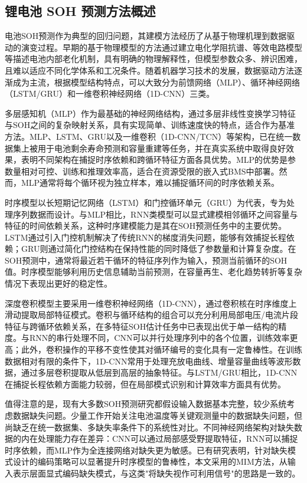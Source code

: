 \documentclass[10pt,a4paper]{ctexart}
\begin{document}
\subsection{锂电池 SOH 预测方法概述}

电池SOH预测作为典型的回归问题，其建模方法经历了从基于物理机理到数据驱动的演变过程\cite{liu2025deep}。早期的基于物理模型的方法通过建立电化学阻抗谱、等效电路模型等描述电池内部老化机制，具有明确的物理解释性，但模型参数众多、辨识困难，且难以适应不同化学体系和工况条件。随着机器学习技术的发展，数据驱动方法逐渐成为主流\cite{liu2025deep}，根据模型结构特点，可以大致分为前馈网络（MLP）、循环神经网络（LSTM/GRU）和一维卷积神经网络（1D-CNN）三类。

多层感知机（MLP）作为最基础的神经网络结构，通过多层非线性变换学习特征与SOH之间的复杂映射关系，具有实现简单、训练速度快的特点，适合作为基准方法\cite{bairwa2025cycle}。MLP、LSTM、GRU以及一维卷积（1D-CNN/TCN）等架构，已在统一数据集上被用于电池剩余寿命预测和容量重建等任务，并在真实系统中取得良好效果\cite{bairwa2025cycle}，表明不同架构在捕捉时序依赖和跨循环特征方面各具优势。MLP的优势是参数量相对可控、训练和推理效率高，适合在资源受限的嵌入式BMS中部署。然而，MLP通常将每个循环视为独立样本，难以捕捉循环间的时序依赖关系。

时序模型以长短期记忆网络（LSTM）和门控循环单元（GRU）为代表，专为处理序列数据而设计\cite{bairwa2025cycle}。与MLP相比，RNN类模型可以显式建模相邻循环之间容量与特征的时间依赖关系，这种时序建模能力是其在SOH预测任务中的主要优势。LSTM通过引入门控机制解决了传统RNN的梯度消失问题，能够有效捕捉长程依赖；GRU则通过简化门控结构在保持性能的同时降低了参数量和计算复杂度。在SOH预测中，通常将最近若干循环的特征序列作为输入，预测当前循环的SOH值。时序模型能够利用历史信息辅助当前预测，在容量再生、老化趋势转折等复杂情况下表现出更好的稳定性。

深度卷积模型主要采用一维卷积神经网络（1D-CNN），通过卷积核在时序维度上滑动提取局部特征模式\cite{zhang2024cnnsoh}。卷积与循环结构的组合可以充分利用局部电压/电流片段特征与跨循环依赖关系，在多特征SOH估计任务中已表现出优于单一结构的精度\cite{zhang2024cnnsoh}。与RNN的串行处理不同，CNN可以并行处理序列中的各个位置，训练效率更高；此外，卷积操作的平移不变性使其对循环编号的变化具有一定鲁棒性。在训练数据相对有限的条件下，1D-CNN常用于处理充放电曲线、增量容量曲线等波形数据，通过多层卷积提取从低层到高层的抽象特征。与LSTM/GRU相比，1D-CNN在捕捉长程依赖方面能力较弱，但在局部模式识别和计算效率方面具有优势。

值得注意的是，现有大多数SOH预测研究都假设输入数据基本完整，较少系统考虑数据缺失问题\cite{shao2025soh,deng2025novel}。少量工作开始关注电池温度等关键观测量中的数据缺失问题，但尚缺乏在统一数据集、多缺失率条件下的系统性对比\cite{shao2025soh}。不同神经网络架构对缺失数据的内在处理能力存在差异：CNN可以通过局部感受野提取特征，RNN可以捕捉时序依赖，而MLP作为全连接网络对缺失更为敏感。已有研究表明，针对缺失模式设计的编码策略可以显著提升时序模型的鲁棒性\cite{che2018recurrent}，本文采用的MIM方法，从输入表示层面显式编码缺失模式，与这类"将缺失视作可利用信号"的思路是一致的。
\end{document}
